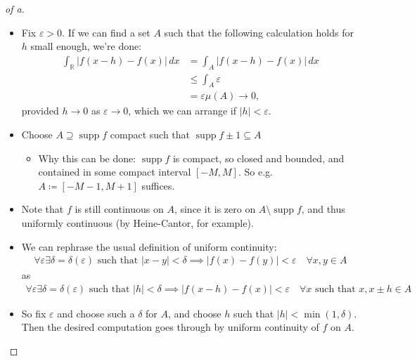 \begin{solution}

\envlist

\begin{proof}[of a]

\begin{itemize}
\item
  Fix \(\varepsilon > 0\). If we can find a set \(A\) such that the
  following calculation holds for \(h\) small enough, we're done:
  \begin{align*}
  \int_{\mathbb{R}}{\left\lvert {f(x-h) - f(x)} \right\rvert} \,dx
  &= \int_A {\left\lvert {f(x-h) - f(x)} \right\rvert} \,dx\\
  &\leq \int_A {\varepsilon}\\
  &= {\varepsilon}\mu(A) \longrightarrow 0
  ,\end{align*}
  provided \(h\to 0\) as \({\varepsilon}\to 0\), which we can arrange if
  \({\left\lvert {h} \right\rvert} < {\varepsilon}\).
\item
  Choose \(A\supseteq{\operatorname{supp}}f\) compact such that
  \({\operatorname{supp}}f \pm 1 \subseteq A\)

  \begin{itemize}
  \tightlist
  \item
    Why this can be done: \({\operatorname{supp}}f\) is compact, so
    closed and bounded, and contained in some compact interval
    \([-M, M]\). So e.g.~\(A\coloneqq[-M-1, M+1]\) suffices.
  \end{itemize}
\item
  Note that \(f\) is still continuous on \(A\), since it is zero on
  \(A\setminus{\operatorname{supp}}f\), and thus uniformly continuous
  (by Heine-Cantor, for example).
\item
  We can rephrase the usual definition of uniform continuity:
  \begin{align*}
  \forall {\varepsilon}\exists \delta = \delta({\varepsilon}) \text{ such that } {\left\lvert {x - y} \right\rvert} < \delta \implies {\left\lvert {f(x) - f(y)} \right\rvert} < {\varepsilon}\quad \forall x, y\in A
  \end{align*}
  as
  \begin{align*}
  \forall {\varepsilon}\exists \delta = \delta({\varepsilon}) \text{ such that } {\left\lvert {h} \right\rvert} < \delta \implies {\left\lvert {f(x-h) - f(x)} \right\rvert} < {\varepsilon}\quad \forall x \text{ such that }x, x\pm h \in A
  \end{align*}
\item
  So fix \({\varepsilon}\) and choose such a \(\delta\) for \(A\), and
  choose \(h\) such that
  \({\left\lvert {h} \right\rvert} < \min(1, \delta)\). Then the desired
  computation goes through by uniform continuity of \(f\) on \(A\).
\end{itemize}


\end{proof}
\end{solution}
